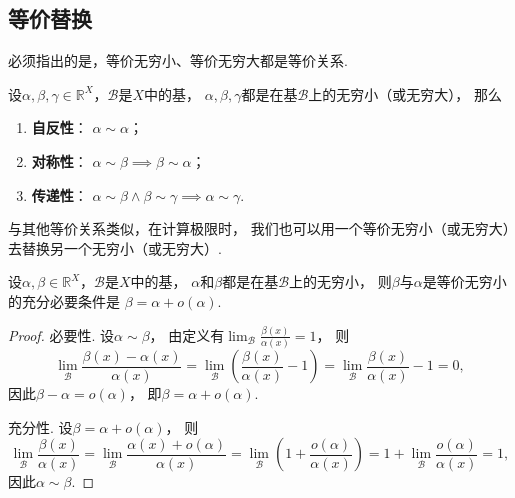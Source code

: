 \subsection{等价替换}
必须指出的是，等价无穷小、等价无穷大都是等价关系.
\begin{property}
设\(\alpha,\beta,\gamma\in\mathbb{R}^X\)，\(\mathcal{B}\)是\(X\)中的基，
\(\alpha,\beta,\gamma\)都是在基\(\mathcal{B}\)上的无穷小（或无穷大），
那么\begin{enumerate}
	\item {\bf 自反性}：
	\(\alpha \sim \alpha\)；

	\item {\bf 对称性}：
	\(\alpha \sim \beta \implies \beta \sim \alpha\)；

	\item {\bf 传递性}：
	\(\alpha \sim \beta \land \beta \sim \gamma \implies \alpha \sim \gamma\).
\end{enumerate}
\end{property}

与其他等价关系类似，在计算极限时，
我们也可以用一个等价无穷小（或无穷大）去替换另一个无穷小（或无穷大）.

\begin{theorem}\label{theorem:极限.无穷小的比较1}
设\(\alpha,\beta\in\mathbb{R}^X\)，\(\mathcal{B}\)是\(X\)中的基，
\(\alpha\)和\(\beta\)都是在基\(\mathcal{B}\)上的无穷小，
则\(\beta\)与\(\alpha\)是等价无穷小的充分必要条件是
\(\beta = \alpha + o(\alpha)\).
\begin{proof}
必要性.
设\(\alpha\sim\beta\)，
由定义有\(\lim_\mathcal{B} \frac{\beta(x)}{\alpha(x)} = 1\)，
则\[
	\lim_\mathcal{B} \frac{\beta(x)-\alpha(x)}{\alpha(x)}
	= \lim_\mathcal{B} \left(\frac{\beta(x)}{\alpha(x)}-1\right)
	= \lim_\mathcal{B} \frac{\beta(x)}{\alpha(x)}-1 = 0,
\]
因此\(\beta-\alpha=o(\alpha)\)，
即\(\beta=\alpha+o(\alpha)\).

充分性.
设\(\beta=\alpha+o(\alpha)\)，
则\[
	\lim_\mathcal{B} \frac{\beta(x)}{\alpha(x)}
	= \lim_\mathcal{B} \frac{\alpha(x)+o(\alpha)}{\alpha(x)}
	= \lim_\mathcal{B} \left(1+\frac{o(\alpha)}{\alpha(x)}\right)
	= 1 + \lim_\mathcal{B} \frac{o(\alpha)}{\alpha(x)}
	= 1,
\]
因此\(\alpha\sim\beta\).
\end{proof}
\end{theorem}

